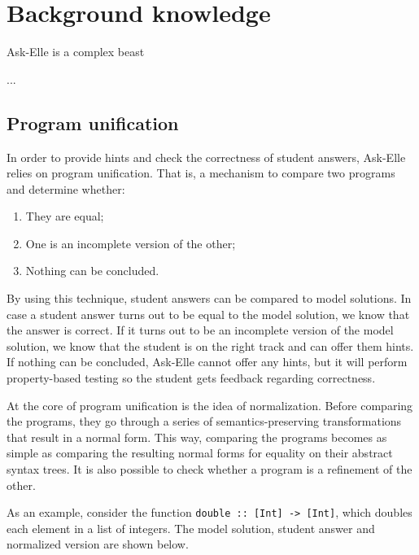 \chapter{Background knowledge}


Ask-Elle is a complex beast

...

\section{Program unification}

In order to provide hints and check the correctness of student answers, Ask-Elle relies on program unification. That is, a mechanism to compare two programs and determine whether:

\begin{enumerate}
    \item They are equal;
    \item One is an incomplete version of the other;
    \item Nothing can be concluded. %
\end{enumerate}

By using this technique, student answers can be compared to model solutions. In case a student answer turns out to be equal to the model solution, we know that the answer is correct. If it turns out to be an incomplete version of the model solution, we know that the student is on the right track and can offer them hints. If nothing can be concluded, Ask-Elle cannot offer any hints, but it will perform property-based testing so the student gets feedback regarding correctness.

At the core of program unification is the idea of normalization. Before comparing the programs, they go through a series of semantics-preserving transformations that result in a normal form. This way, comparing the programs becomes as simple as comparing the resulting normal forms for equality on their abstract syntax trees. It is also possible to check whether a program is a refinement of the other.

As an example, consider the function \texttt{double :: [Int] -> [Int]}, which doubles each element in a list of integers. The model solution, student answer and normalized version are shown below.

